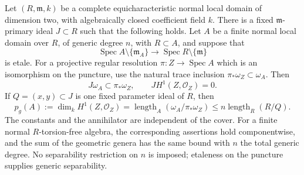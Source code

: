 \begin{proposition}
\label{D:cover-uniform-canonical-defect}
Let $(R,\mathfrak m,k)$ be a complete equicharacteristic normal local
domain of dimension two, with algebraically closed coefficient field $k$.
There is a fixed $\mathfrak m$-primary ideal $J\subset R$ such that the
following holds. Let $A$ be a finite normal local domain over $R$, of
generic degree $n$, with $R\subset A$, and suppose that
\[
 \operatorname{Spec}A\setminus\{\mathfrak m_A\}
 \longrightarrow \operatorname{Spec}R\setminus\{\mathfrak m\}
\]
is etale. For a projective regular resolution
$\pi:Z\to\operatorname{Spec}A$ which is an isomorphism on the puncture,
use the natural trace inclusion $\pi_*\omega_Z\subset\omega_A$. Then
\[
 J\omega_A\subset\pi_*\omega_Z,
 \qquad JH^1(Z,\mathcal O_Z)=0.                         \tag{D.CD.1}
\]
If $Q=(x,y)\subset J$ is one fixed parameter ideal of $R$, then
\[
 p_g(A):=\dim_kH^1(Z,\mathcal O_Z)
 =\operatorname{length}_A(\omega_A/\pi_*\omega_Z)
 \le n\operatorname{length}_R(R/Q).                    \tag{D.CD.2}
\]
The constants and the annihilator are independent of the cover.
For a finite normal $R$-torsion-free algebra, the corresponding assertions
hold componentwise, and the sum of the geometric genera has the same bound
with $n$ the total generic degree. No separability restriction on $n$ is
imposed; etaleness on the puncture supplies generic separability.
\end{proposition}
